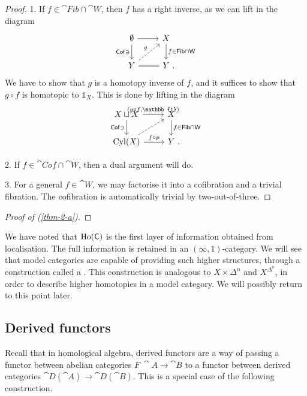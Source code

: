 \begin{proof}
    1. If $f \in \cat{Fib}\cap\cat{W}$,
    then $f$ has a right inverse, as we can lift in the diagram 
    \[ \begin{tikzcd}
        \emptyset \ar[r] \ar[d,"\cat{Cof}\ni"'] &
        X \ar[d,"f\in\cat{Fib}\cap\cat{W}"] \\
        Y \ar[ur,dashed,"g"] \ar[r,equals] & Y \rlap{\ .}
    \end{tikzcd} \]
    We have to show that $g$ is a homotopy inverse of $f$,
    and it suffices to show that $g\circ f$ is homotopic to $\mathbb{1}_X$.
    This is done by lifting in the diagram 
    \[ \begin{tikzcd}
        X\sqcup X \ar[r,"(g\circ f\comma\mathbb{1})"] \ar[d,"\cat{Cof}\ni"'] &
        X \ar[d,"f\in\cat{Fib}\cap\cat{W}"] \\
        \operatorname{Cyl}(X) \ar[ur,dashed] \ar[r,"f\circ p"] & Y\rlap{\ .}
    \end{tikzcd} \]

    2. If $f \in \cat{Cof}\cap\cat{W}$,
    then a dual argument will do.

    3. For a general $f\in\cat{W}$,
    we may factorise it into a cofibration and a trivial fibration.
    The cofibration is automatically trivial by two-out-of-three.
\end{proof}

\begin{proof}[Proof of \textup{(\ref{thm-2-a})}]
    \nyw
\end{proof}

\begin{remark}
    We have noted that $\operatorname{Ho}(\mathsf{C})$
    is the first layer of information obtained from localisation.
    The full information is retained in an $(\infty,1)$-category.
    We will see that model categories are capable of providing
    such higher structures,
    through a construction called a .
    This construction is analogous to $X\times\Delta^n$ and $X^{\Delta^n}$,
    in order to describe higher homotopies in a model category.
    We will possibly return to this point later. \varqed
\end{remark}

\subsection{Derived functors}

Recall that in homological algebra,
derived functors are a way of passing a functor
between abelian categories $F\:\cat{A}\to\cat{B}$
to a functor between derived categories $\cat{D}(\cat{A})\to\cat{D}(\cat{B})$.
This is a special case of the following construction.

